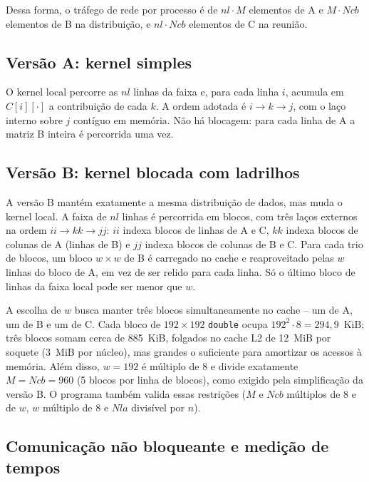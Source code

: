 \documentclass[conference]{IEEEtran}
\begin{document}
Dessa forma, o tráfego de rede por processo é de $nl \cdot M$ elementos de A
e $M \cdot Ncb$ elementos de B na distribuição, e $nl \cdot Ncb$ elementos
de C na reunião.

\subsection{Versão A: kernel simples}

O kernel local percorre as $nl$ linhas da faixa e, para cada linha $i$,
acumula em $C[i][\cdot]$ a contribuição de cada $k$. A ordem adotada é
$i \rightarrow k \rightarrow j$, com o laço interno sobre $j$ contíguo em
memória. Não há blocagem: para cada linha de A a matriz B inteira é
percorrida uma vez.

\subsection{Versão B: kernel blocada com ladrilhos}

A versão B mantém exatamente a mesma distribuição de dados, mas muda o kernel
local. A faixa de $nl$ linhas é percorrida em blocos, com três laços externos
na ordem $ii \rightarrow kk \rightarrow jj$: $ii$ indexa blocos de linhas de
A e C, $kk$ indexa blocos de colunas de A (linhas de B) e $jj$ indexa blocos
de colunas de B e C. Para cada trio de blocos, um bloco $w \times w$ de B é
carregado no cache e reaproveitado pelas $w$ linhas do bloco de A, em vez de
ser relido para cada linha. Só o último bloco de linhas da faixa local pode
ser menor que $w$.

A escolha de $w$ busca manter três blocos simultaneamente no cache -- um de
A, um de B e um de C. Cada bloco de $192 \times 192$ \texttt{double} ocupa
$192^2 \cdot 8 = 294{,}9$~KiB; três blocos somam cerca de 885~KiB, folgados
no cache L2 de 12~MiB por soquete (3~MiB por núcleo), mas grandes o
suficiente para amortizar os acessos à memória. Além disso, $w = 192$ é
múltiplo de 8 e divide exatamente $M = Ncb = 960$ (5 blocos por linha de
blocos), como exigido pela simplificação da versão B. O programa também
valida essas restrições ($M$ e $Ncb$ múltiplos de 8 e de $w$, $w$ múltiplo de
8 e $Nla$ divisível por $n$).

\subsection{Comunicação não bloqueante e medição de tempos}
\end{document}
